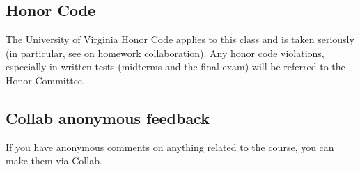 \documentclass[oneside,11pt]{amsart}
\begin{document}
\subsection{Honor Code} The University of Virginia Honor Code applies to this
class and is taken seriously (in particular, 
see  on homework collaboration).
Any honor code violations,
especially in written tests (midterms and the final exam)
will be referred to the
Honor Committee.

\subsection{Collab anonymous feedback}
If you have anonymous comments on anything related to the course, you can make
them via Collab.
\end{document}
